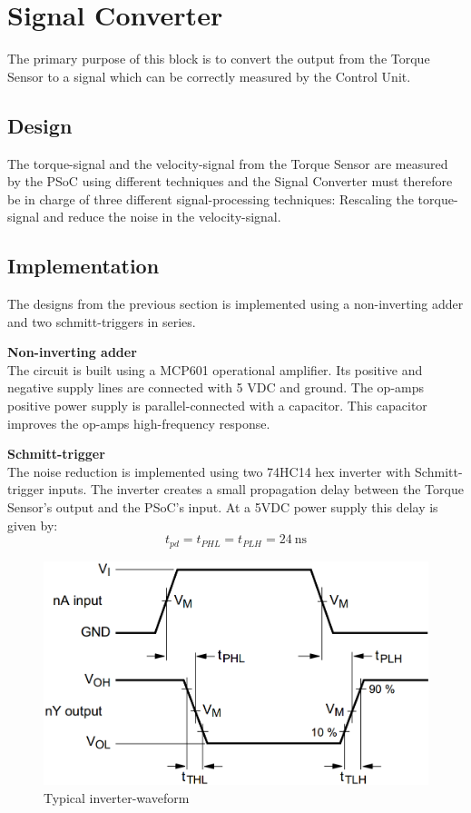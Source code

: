\newpage
\section{Signal Converter}
The primary purpose of this block is to convert the output from the Torque Sensor to a signal which can be correctly measured by the Control Unit.

\subsection{Design}
The torque-signal and the velocity-signal from the Torque Sensor are measured by the PSoC using different techniques and the Signal Converter must therefore be in charge of three different signal-processing techniques: Rescaling the torque-signal and reduce the noise in the velocity-signal.




\subsection{Implementation}
The designs from the previous section is implemented using a non-inverting adder and two schmitt-triggers in series.

\textbf{Non-inverting adder}\\
The circuit is built using a MCP601 operational amplifier. Its positive and negative supply lines are connected with 5 VDC and ground. The op-amps positive power supply is parallel-connected with a capacitor. This capacitor improves the op-amps high-frequency response.

\textbf{Schmitt-trigger}\\
The noise reduction is implemented using two 74HC14 hex inverter with Schmitt-trigger inputs. The inverter creates a small propagation delay between the Torque Sensor's output and the PSoC's input. At a 5VDC power supply this delay is given by:
\begin{equation}
	t_{pd} = t_{PHL} = t_{PLH} = \SI{24}{\nano \second}
\end{equation}

\begin{figure}[H]
	\centering
	\includegraphics[width=0.5\linewidth]{Hardware/Pictures/74HC14_waveform}
	\caption{Typical inverter-waveform}
	\label{fig:SchmittTrigger_waveform}
\end{figure}

